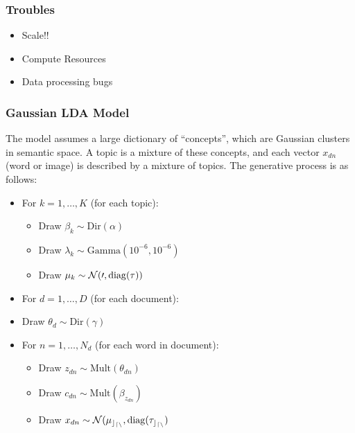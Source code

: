 \documentclass{beamer}
\DeclareMathOperator{\diag}{diag}
\begin{document}
\begin{frame}
  \frametitle{Troubles}
  \begin{itemize}
  \item Scale!!
  \item Compute Resources
  \item Data processing bugs
  \end{itemize}
\end{frame}


\begin{frame}
  \frametitle{Gaussian LDA Model}
  The model assumes a large dictionary of ``concepts'', which are Gaussian clusters in semantic space. A topic is a mixture of these concepts, and each vector $x_{dn}$ (word or image) is described by a mixture of topics. The generative process is as follows:
  \begin{itemize}
    \item For $k = 1, \ldots, K$ (for each topic):
      \begin{itemize}
        \item Draw $\beta_k \sim \text{Dir}(\alpha)$
        \item Draw $\lambda_k \sim \text{Gamma}(10^{-6}, 10^{-6})$
        \item Draw $\mu_k \sim \cal{N}(0, \diag(\tau))$
      \end{itemize}
    \item For $d = 1, \ldots, D$ (for each document):
      \item Draw $\theta_d \sim \text{Dir}(\gamma)$
      \item For $n = 1, \ldots, N_d$ (for each word in document):
      \begin{itemize}
        \item Draw $z_{dn} \sim \text{Mult}(\theta_{dn})$
        \item Draw $c_{dn} \sim \text{Mult}(\beta_{z_{dn}})$
        \item Draw $x_{dn} \sim \cal{N}(\mu_{c_{dn}}, \diag(\tau_{c_{dn}})$
      \end{itemize}
  \end{itemize}
\end{frame}
\end{document}
